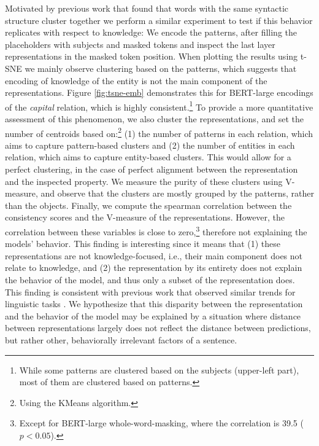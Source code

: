 Motivated by previous work that found that words with the same syntactic structure cluster together \cite{chi-etal-2020-finding,ravfogel-etal-2020-unsupervised} we perform a similar experiment to test if this behavior replicates with respect to knowledge:
We encode the patterns, after filling the placeholders with subjects and masked tokens and inspect the last layer representations in the masked token position.
When plotting the results using t-SNE \cite{tsne} we mainly
observe clustering based on the patterns, which suggests
that encoding of knowledge of the entity is not the main component of the representations.
Figure \ref{fig:tsne-emb} demonstrates
this for BERT-large encodings of the \textit{capital} relation, which is highly consistent.\footnote{While some patterns are clustered based on the subjects (upper-left part), most of them are clustered based on patterns.}
To provide a more quantitative assessment of this phenomenon, 
we also cluster the representations, and set the number of centroids based on:\footnote{Using the KMeans algorithm.} (1) the number of patterns in each relation, which aims to capture pattern-based clusters and (2) the number of entities in each relation, which aims to capture entity-based clusters. This would allow for a perfect clustering, in the case of perfect alignment between the representation and the inspected property.
We measure the purity of these clusters using V-measure, and observe that the clusters are mostly grouped by the patterns, rather than the objects.
Finally, we compute the spearman correlation between the consistency scores and the V-measure of the representations.
However, the correlation between these variables is close to zero,\footnote{Except for BERT-large whole-word-masking, where the correlation is 39.5 ($p<0.05$).} therefore not explaining the models' behavior.
This finding is interesting since it means that (1) these representations are not knowledge-focused, i.e., their main component does not relate to knowledge, and (2) the representation by its entirety does not explain the behavior of the model, and thus only a subset of the representation does. This finding is consistent with previous work that observed similar trends for linguistic tasks \cite{amnesic_probing}.
We hypothesize that this disparity between the
representation and the behavior of the model may be
explained by a situation where distance between
representations largely does not reflect the distance
between predictions, but rather other, behaviorally irrelevant factors of a sentence.


